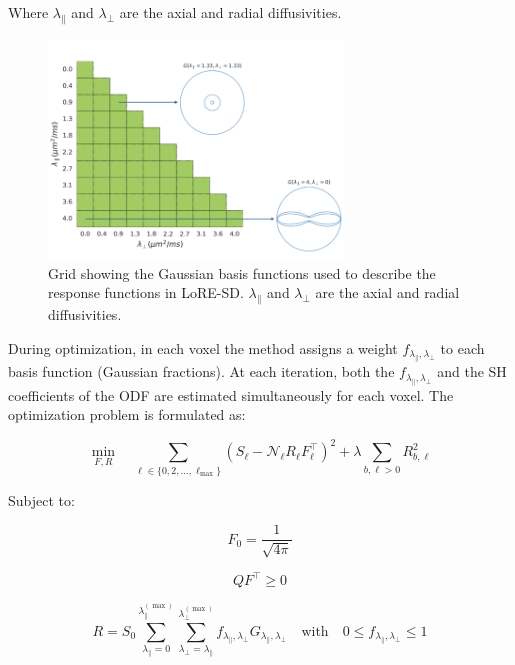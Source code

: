 Where $\lambda_{\parallel}$ and $\lambda_{\perp}$ are the axial and radial diffusivities.

\begin{figure}[h]
  \centering
  \includegraphics[width=0.7\textwidth]{Images/grid.png} %
  \caption{Grid showing the Gaussian basis functions used to describe the response functions in LoRE-SD. $\lambda_{\parallel}$ and $\lambda_{\perp}$ are the axial and radial diffusivities.}
  \label{fig:grid}
\end{figure}

During optimization, in each voxel the method assigns a weight $f_{\lambda_\parallel, \lambda_\perp}$ to each basis function (Gaussian fractions). At each iteration, both the $f_{\lambda_\parallel, \lambda_\perp}$ and the SH coefficients of the ODF are estimated simultaneously for each voxel. The optimization problem is formulated as:

\begin{equation}
\min_{F, R} \quad \sum_{\ell \in \{0,2,\dots,\ell_{\max}\}} \left(S_\ell - \mathcal{N}_\ell R_\ell F_\ell^\top \right)^2 + \lambda \sum_{b,\ell>0} R_{b,\ell}^2
\end{equation}

Subject to:

\begin{equation}
F_0 = \frac{1}{\sqrt{4\pi}}
\end{equation}

\begin{equation}
Q F^\top \geq 0
\end{equation}

\begin{equation}
R = S_0 \sum_{\lambda_\parallel = 0}^{\lambda_\parallel^{(\max)}} \sum_{\lambda_\perp = \lambda_\parallel}^{\lambda_\perp^{(\max)}} f_{\lambda_\parallel, \lambda_\perp} G_{\lambda_\parallel, \lambda_\perp}
\quad \text{with} \quad 0 \leq f_{\lambda_\parallel, \lambda_\perp} \leq 1
\end{equation}

